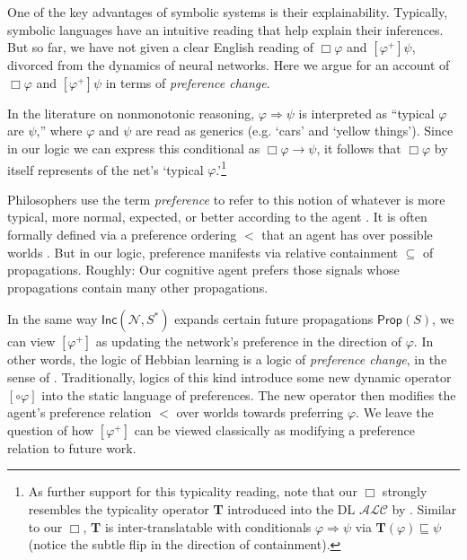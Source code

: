 \documentclass[12pt]{article}
\theoremstyle{definition}
\newcommand{\Prop}{\textsf{Prop}}
\newcommand{\Inc}{\textsf{Inc}}
\newcommand{\Net}{\mathcal{N}}
\begin{document}
One of the key advantages of symbolic systems is their explainability.  Typically, symbolic languages have an intuitive reading that help explain their inferences.  But so far, we have not given a clear English reading of $\Box \varphi$ and $[\varphi^+] \psi$, divorced from the dynamics of neural networks.  Here we argue for an account of $\Box \varphi$ and $[\varphi^+] \psi$ in terms of \emph{preference change}.


In the literature on nonmonotonic reasoning, $\varphi \Rightarrow \psi$ is interpreted as ``typical $\varphi$ are $\psi$,'' where $\varphi$ and $\psi$ are read as generics (e.g. `cars' and `yellow things').  Since in our logic we can express this conditional as $\Box \varphi \to \psi$, it follows that $\Box \varphi$ by itself represents of the net's `typical $\varphi$.'\footnote{As further support for this typicality reading, note that our $\Box$ strongly resembles the typicality operator \textbf{T} introduced into the DL $\mathcal{ALC}$ by \cite{giordano2009alc+}.  Similar to our $\Box$, \textbf{T} is inter-translatable with conditionals $\varphi \Rightarrow \psi$ via \textbf{T}$(\varphi) \sqsubseteq \psi$ (notice the subtle flip in the direction of containment).}


Philosophers use the term \emph{preference} to refer to this notion of whatever is more typical, more normal, expected, or better according to the agent \cite{van2007prefupgrade}.  It is often formally defined via a preference ordering $<$ that an agent has over possible worlds \cite{kraus1990nonmonotonic}.  But in our logic, preference manifests via relative containment $\subseteq$ of propagations.  Roughly: Our cognitive agent prefers those signals whose propagations contain many other propagations.



In the same way $\Inc(\Net, S^\ast)$ expands certain future propagations $\Prop(S)$, we can view $[\varphi^+]$ as updating the network's preference in the direction of $\varphi$.  In other words, the logic of Hebbian learning is a logic of \emph{preference change}, in the sense of \cite{van2007prefupgrade}.  Traditionally, logics of this kind introduce some new dynamic operator $[\circ \varphi]$ into the static language of preferences.  The new operator then modifies the agent's preference relation $<$ over worlds towards preferring $\varphi$.  We leave the question of how $[\varphi^+]$ can be viewed classically as modifying a preference relation to future work.
\end{document}
